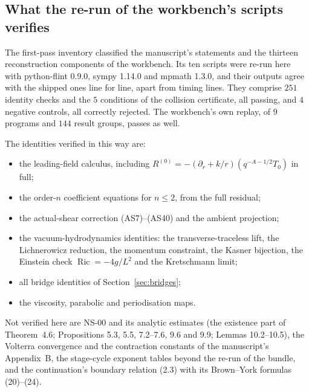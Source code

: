 \subsection{What the re-run of the workbench's scripts verifies}

The first-pass inventory classified the manuscript's statements and the thirteen reconstruction components of the workbench. Its ten scripts were re-run here with python-flint 0.9.0, sympy 1.14.0 and mpmath 1.3.0, and their outputs agree with the shipped ones line for line, apart from timing lines. They comprise $251$ identity checks and the $5$ conditions of the collision certificate, all passing, and $4$ negative controls, all correctly rejected. The workbench's own replay, of $9$ programs and $144$ result groups, passes as well.

The identities verified in this way are:
\begin{itemize}
\item the leading-field calculus, including $R^{(0)}=-(\partial_r+k/r)(q^{-A-1/2}T_0)$ in full;
\item the order-$n$ coefficient equations for $n\le2$, from the full residual;
\item the actual-shear correction (AS7)--(AS40) and the ambient projection;
\item the vacuum-hydrodynamics identities: the transverse-traceless lift, the Lichnerowicz reduction, the momentum constraint, the Kasner bijection, the Einstein check $\operatorname{Ric}=-4g/L^2$ and the Kretschmann limit;
\item all bridge identities of Section~\ref{sec:bridges};
\item the viscosity, parabolic and periodisation maps.
\end{itemize}

Not verified here are NS-00 and its analytic estimates (the existence part of Theorem~4.6; Propositions 5.3, 5.5, 7.2--7.6, 9.6 and 9.9; Lemmas 10.2--10.5), the Volterra convergence and the contraction constants of the manuscript's Appendix~B, the stage-cycle exponent tables beyond the re-run of the bundle, and the continuation's boundary relation (2.3) with its Brown--York formulas (20)--(24).
